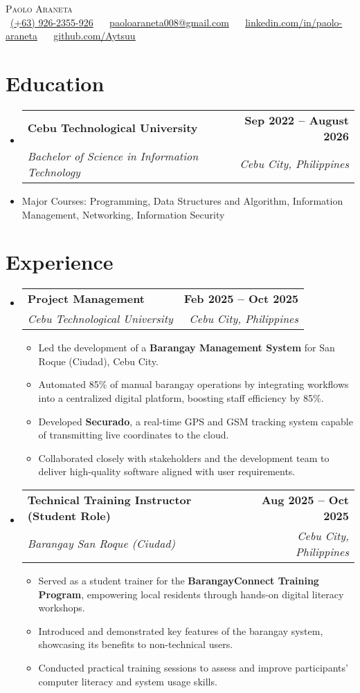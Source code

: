 \documentclass[letterpaper,11pt]{article}
\makeatletter
\newcommand{\resumeItem}[1]{
  \item\small{
    {#1 \vspace{0pt}}
  }
}
\newcommand{\resumeSubheading}[4]{
  \vspace{-2pt}\item
    \begin{tabular*}{1.0\textwidth}[t]{l@{\extracolsep{\fill}}r}
      \textbf{#1} & \textbf{\small #2} \\
      \textit{\small#3} & \textit{\small #4} \\
    \end{tabular*}\vspace{-7pt}
}
\newcommand{\resumeSubHeadingListStart}{\begin{itemize}[leftmargin=0.0in, label={}]}
\newcommand{\resumeSubHeadingListEnd}{\end{itemize}}\vspace{0pt}
\newcommand{\resumeItemListStart}{\begin{itemize}}
\newcommand{\resumeItemListEnd}{\end{itemize}\vspace{-5pt}}
\makeatother
\begin{document}
\begin{center}
    {\Large \scshape Paolo Araneta} \\[2mm]
    \footnotesize \raisebox{-0.1\height}
    \faPhone\ \underline{(+63) 926-2355-926} ~ 
    {\faEnvelope\  \underline{paoloaraneta008@gmail.com}} ~ 
    {\faLinkedin\ \underline{\href{https://www.linkedin.com/in/paolo-araneta-65b332336/}{linkedin.com/in/paolo-araneta}}} ~
    {\faGithub\ \underline{\href{https://github.com/Aytsuu}{github.com/Aytsuu}}} ~
\end{center}

\section{Education}
  \resumeSubHeadingListStart
    \resumeSubheading
      {Cebu Technological University}{Sep 2022 -- August 2026}
      {Bachelor of Science in Information Technology
      }{Cebu City, Philippines}
  \resumeSubHeadingListEnd
    \resumeItemListStart
        \vspace{-7pt}
        \resumeItem {Major Courses: Programming, Data Structures and Algorithm, Information Management, Networking, Information Security}
    \resumeItemListEnd
    \vspace{-12pt}
\section{Experience}
    \resumeSubHeadingListStart
      \resumeSubheading{Project Management}{Feb 2025 -- Oct 2025}{Cebu Technological University}{Cebu City, Philippines} 
        \resumeItemListStart
          \resumeItem{Led the development of a \textbf{Barangay Management System} for San Roque (Ciudad), Cebu City.}
          \resumeItem{Automated 85\% of manual barangay operations by integrating workflows into a centralized digital platform, boosting staff efficiency by 85\%.}
          \resumeItem{Developed \textbf{Securado}, a real-time GPS and GSM tracking system capable of transmitting live coordinates to the cloud.}
          \resumeItem{Collaborated closely with stakeholders and the development team to deliver high-quality software aligned with user requirements.}
        \resumeItemListEnd
      \resumeSubheading{Technical Training Instructor (Student Role)}{Aug 2025 -- Oct 2025}{Barangay San Roque (Ciudad)}{Cebu City, Philippines} 
        \resumeItemListStart
          \resumeItem{Served as a student trainer for the \textbf{BarangayConnect Training Program}, empowering local residents through hands-on digital literacy workshops.}
          \resumeItem{Introduced and demonstrated key features of the barangay system, showcasing its benefits to non-technical users.}
          \resumeItem{Conducted practical training sessions to assess and improve participants' computer literacy and system usage skills.}
        \resumeItemListEnd
    \resumeSubHeadingListEnd
    \vspace{-12pt}
\end{document}
